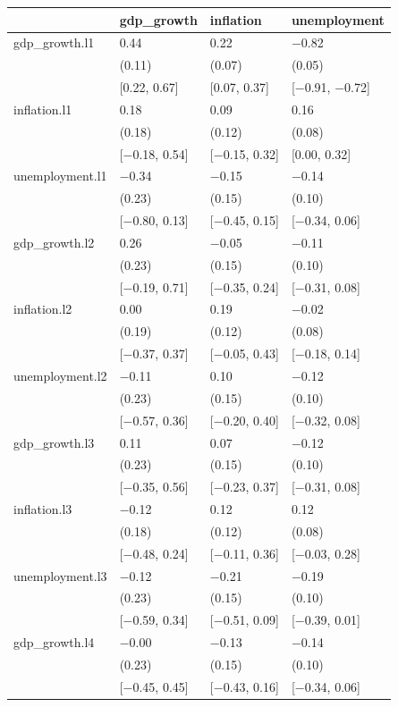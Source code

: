 \documentclass{article}
\begin{document}
\begin{tabular}{llll}
\toprule
 & gdp\_growth & inflation & unemployment \\
\midrule
gdp\_growth.l1 & 0.44 & 0.22 & $-$0.82 \\
 & (0.11) & (0.07) & (0.05) \\
 & [0.22, 0.67] & [0.07, 0.37] & [$-$0.91, $-$0.72] \\
inflation.l1 & 0.18 & 0.09 & 0.16 \\
 & (0.18) & (0.12) & (0.08) \\
 & [$-$0.18, 0.54] & [$-$0.15, 0.32] & [0.00, 0.32] \\
unemployment.l1 & $-$0.34 & $-$0.15 & $-$0.14 \\
 & (0.23) & (0.15) & (0.10) \\
 & [$-$0.80, 0.13] & [$-$0.45, 0.15] & [$-$0.34, 0.06] \\
gdp\_growth.l2 & 0.26 & $-$0.05 & $-$0.11 \\
 & (0.23) & (0.15) & (0.10) \\
 & [$-$0.19, 0.71] & [$-$0.35, 0.24] & [$-$0.31, 0.08] \\
inflation.l2 & 0.00 & 0.19 & $-$0.02 \\
 & (0.19) & (0.12) & (0.08) \\
 & [$-$0.37, 0.37] & [$-$0.05, 0.43] & [$-$0.18, 0.14] \\
unemployment.l2 & $-$0.11 & 0.10 & $-$0.12 \\
 & (0.23) & (0.15) & (0.10) \\
 & [$-$0.57, 0.36] & [$-$0.20, 0.40] & [$-$0.32, 0.08] \\
gdp\_growth.l3 & 0.11 & 0.07 & $-$0.12 \\
 & (0.23) & (0.15) & (0.10) \\
 & [$-$0.35, 0.56] & [$-$0.23, 0.37] & [$-$0.31, 0.08] \\
inflation.l3 & $-$0.12 & 0.12 & 0.12 \\
 & (0.18) & (0.12) & (0.08) \\
 & [$-$0.48, 0.24] & [$-$0.11, 0.36] & [$-$0.03, 0.28] \\
unemployment.l3 & $-$0.12 & $-$0.21 & $-$0.19 \\
 & (0.23) & (0.15) & (0.10) \\
 & [$-$0.59, 0.34] & [$-$0.51, 0.09] & [$-$0.39, 0.01] \\
gdp\_growth.l4 & $-$0.00 & $-$0.13 & $-$0.14 \\
 & (0.23) & (0.15) & (0.10) \\
 & [$-$0.45, 0.45] & [$-$0.43, 0.16] & [$-$0.34, 0.06] \\

\end{tabular}
\end{document}
